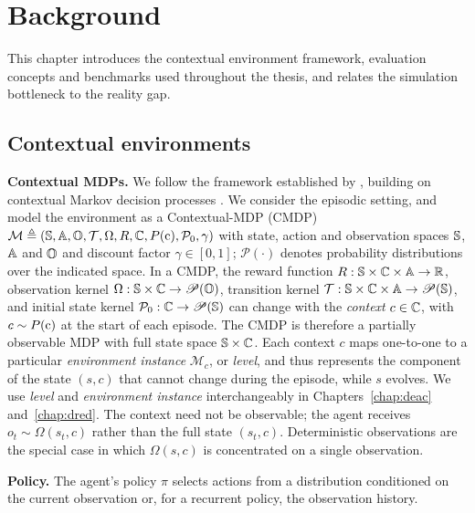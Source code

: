 \chapter{Background}
\label{chap:background}

This chapter introduces the contextual environment framework, evaluation concepts and benchmarks used throughout the thesis, and relates the simulation bottleneck to the reality gap.

\section{Contextual environments}
\label{sec:bg_cmdp}
\textbf{Contextual MDPs.} We follow the framework established by \citet{kirk2023survey}, building on contextual Markov decision processes \citep{hallak2015contextual}. We consider the episodic setting, and model the environment as a Contextual-MDP (CMDP) $\mathcal{M} \triangleq ( {\mathbb{S}}, {\mathbb{A}}, {\mathbb{O}}, \mathcal{T}, \Omega, R, {\mathbb{C}}, P({\textnormal{c}}), \mathcal{P}_0, \gamma)$ with state, action and observation spaces ${\mathbb{S}}$, ${\mathbb{A}}$ and ${\mathbb{O}}$ and discount factor $\gamma\in[0,1]$; $\mathscr{P}(\cdot)$ denotes probability distributions over the indicated space. In a CMDP, the reward function $R:{\mathbb{S}} \times {\mathbb{C}} \times {\mathbb{A}} \rightarrow {\mathbb{R}}$, observation kernel $\Omega: {\mathbb{S}} \times {\mathbb{C}} \rightarrow \mathscr{P}({\mathbb{O}})$, transition kernel $\mathcal{T} : {\mathbb{S}} \times {\mathbb{C}} \times {\mathbb{A}} \rightarrow \mathscr{P}({\mathbb{S}})$, and initial state kernel $\mathcal{P}_0: {\mathbb{C}} \rightarrow \mathscr{P}({\mathbb{S}})$ can change with the \textit{context} $c\in{\mathbb{C}}$, with $c \sim P({\textnormal{c}})$ at the start of each episode. The CMDP is therefore a partially observable MDP with full state space ${\mathbb{S}} \times {\mathbb{C}}$. Each context $c$ maps one-to-one to a particular \textit{environment instance} $\mathcal{M}_c$, or \textit{level}, and thus represents the component of the state $(s,c)$ that cannot change during the episode, while $s$ evolves. We use \textit{level} and \textit{environment instance} interchangeably in Chapters~\ref{chap:deac} and~\ref{chap:dred}. The context need not be observable; the agent receives $o_t\sim\Omega(s_t,c)$ rather than the full state $(s_t,c)$. Deterministic observations are the special case in which $\Omega(s,c)$ is concentrated on a single observation.

\textbf{Policy.} The agent's policy $\pi$ selects actions from a distribution conditioned on the current observation or, for a recurrent policy, the observation history.

